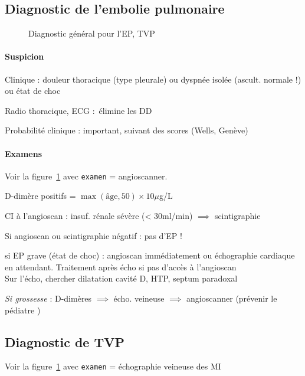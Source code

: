 \subsection{Diagnostic de l'embolie pulmonaire}
\begin{figure}[htpb]
  \centering
  \caption{Diagnostic général pour l'EP, TVP}
  \label{fig:ep-diag}
\end{figure}


\paragraph{Suspicion}
Clinique : douleur thoracique (type pleurale) ou dyspnée isolée (ascult.
normale !) ou état de choc

Radio thoracique, ECG : élimine les DD

Probabilité clinique : important, suivant des scores (Wells, Genève)

\paragraph{Examens}
Voir la figure~\ref{fig:ep-diag} avec \texttt{examen} = angioscanner.

D-dimère positifs = $\max(\text{âge}, 50) \times 10 \mu{}$g/L

CI à l'angioscan : insuf. rénale sévère (< 30ml/min) $\implies$ scintigraphie

Si angioscan ou scintigraphie négatif : pas d'EP !

\danger{} si EP grave (état de choc) : angioscan immédiatement ou échographie
cardiaque en attendant. Traitement après écho si pas d'accès à l'angioscan
\skull\\
Sur l'écho, chercher dilatation cavité D, HTP, septum paradoxal

\textit{Si grossesse}  : D-dimères $\implies$ écho. veineuse $\implies$ angioscanner
(prévenir le pédiatre \skull)

\subsection{Diagnostic de TVP}
Voir la figure~\ref{fig:ep-diag} avec \texttt{examen} = échographie veineuse
des MI


